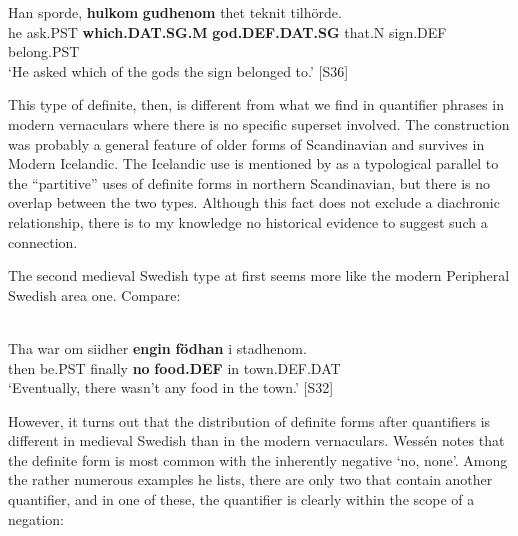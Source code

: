 \z

\ea
\gll Han  sporde,  \textbf{hulkom} \textbf{gudhenom} thet  teknit  tilhörde.\\
he  ask.PST  \textbf{which.DAT.SG.M} \textbf{god.DEF.DAT.SG} that.N  sign.DEF  belong.PST\\
\glt ‘He asked which of the gods the sign belonged to.’ [S36]

\z

This type of definite, then, is different from what we find in quantifier phrases in modern vernaculars where there is no specific superset involved. The construction was probably a general feature of older forms of Scandinavian and survives in Modern Icelandic. The Icelandic use is mentioned by \citet{Riesler2002} as a typological parallel to the “partitive” uses of definite forms in northern Scandinavian, but there is no overlap between the two types. Although this fact does not exclude a diachronic relationship, there is to my knowledge no historical evidence to suggest such a connection.


The second medieval Swedish type at first seems more like the modern Peripheral Swedish area one. Compare:


\ea \label{} 
\\
\gll Tha  war  om siidher  \textbf{engin} \textbf{födhan} i  stadhenom.\\
then  be.PST  finally  \textbf{no} \textbf{food.DEF} in  town.DEF.DAT\\
\glt ‘Eventually, there wasn’t any food in the town.’ [S32]

\z

However, it turns out that the distribution of definite forms after quantifiers is different in medieval Swedish than in the modern vernaculars. Wessén notes that the definite form is most common with the inherently negative  ‘no, none’. Among the rather numerous examples he lists, there are only two that contain another quantifier, and in one of these, the quantifier is clearly within the scope of a negation: 

